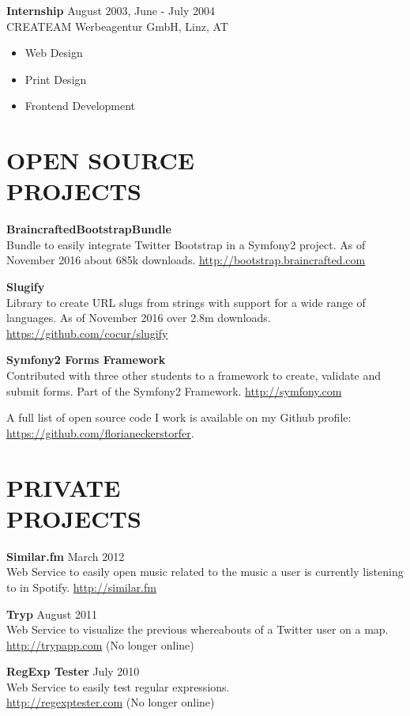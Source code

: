 \documentclass[margin]{res}
\begin{document}
\begin{resume}
\textbf{Internship} \hfill August 2003, June - July 2004 \\
	CREATEAM Werbeagentur GmbH, Linz, AT
	\begin{itemize}  \itemsep -2pt
		\item Web Design
		\item Print Design
		\item Frontend Development
	\end{itemize}

\clearpage

\section{OPEN SOURCE \\ PROJECTS}

\textbf{BraincraftedBootstrapBundle} \\
	Bundle to easily integrate Twitter Bootstrap in a Symfony2 project. As of November 2016 about 685k downloads. \url{http://bootstrap.braincrafted.com}

\textbf{Slugify} \\
	Library to create URL slugs from strings with support for a wide range of languages. As of November 2016 over 2.8m downloads. \url{https://github.com/cocur/slugify}

\textbf{Symfony2 Forms Framework} \\
	Contributed with three other students to a framework to create, validate and submit forms. Part of the Symfony2 Framework. \url{http://symfony.com}

A full list of open source code I work is available on my Github profile: \url{https://github.com/florianeckerstorfer}.

\section{PRIVATE \\ PROJECTS}

\textbf{Similar.fm} \hfill March 2012 \\
	Web Service to easily open music related to the music a user is currently listening to in Spotify. \url{http://similar.fm}

\textbf{Tryp} \hfill August 2011 \\
	Web Service to visualize the previous whereabouts of a Twitter user on a map. \\ \url{http://trypapp.com} (No longer online)

\textbf{RegExp Tester} \hfill July 2010 \\
	Web Service to easily test regular expressions. \\ \url{http://regexptester.com} (No longer online)


\end{resume}
\end{document}
